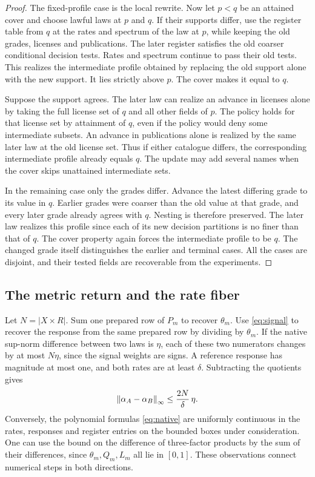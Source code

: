 \begin{proof}
The fixed-profile case is the local rewrite. Now let \(p<q\) be an
attained cover and choose lawful laws at \(p\) and \(q\).
If their supports differ, use the register table from \(q\) at the
rates and spectrum of the law at \(p\), while keeping the old grades,
licenses and publications. The later register satisfies the old coarser
conditional decision tests. Rates and spectrum continue to pass their
old tests. This realizes the intermediate profile obtained by replacing
the old support alone with the new support. It lies strictly above \(p\).
The cover makes it equal to \(q\).

Suppose the support agrees. The later law can realize an advance in
licenses alone by taking the full license set of \(q\) and all other
fields of \(p\). The policy holds for that license set by attainment of
\(q\), even if the policy would deny some intermediate subsets.
An advance in publications alone is realized by the same later law
at the old license set. Thus if either catalogue differs, the
corresponding intermediate profile already equals \(q\). The update
may add several names when the cover skips unattained intermediate
sets.

In the remaining case only the grades differ. Advance the latest
differing grade to its value in \(q\). Earlier grades were coarser than the
old value at that grade, and every later grade already agrees with \(q\).
Nesting is therefore preserved. The later law realizes this profile
since each of its new decision partitions is no finer than that of \(q\).
The cover property again forces the intermediate profile to be \(q\).
The changed grade itself distinguishes the earlier and terminal cases.
All the cases are disjoint, and their tested fields are recoverable
from the experiments.
\end{proof}

\subsection{The metric return and the rate fiber}

Let \(N=|X\times R|\). Sum one prepared row of \(P_m\) to recover
\(\theta_m\). Use \eqref{eq:signal} to recover the response from the same
prepared row by dividing by \(\theta_m\).
If the native sup-norm difference between two laws is \(\eta\),
each of these two numerators changes by at most \(N\eta\), since
the signal weights are signs. A reference response has magnitude at
most one, and both rates are at least \(\delta\). Subtracting the
quotients gives
\begin{equation}\label{eq:inverse-modulus}
 \left\lVert \alpha_A-\alpha_B \right\rVert_\infty\le \frac{2N}{\delta}\,\eta .
\end{equation}
Conversely, the polynomial formulas \eqref{eq:native} are uniformly
continuous in the rates, responses and register entries on the
bounded boxes under consideration. One can use the bound on the
difference of three-factor products by the sum of their differences,
since \(\theta_m,Q_m,L_m\) all lie in \([0,1]\).
These observations connect numerical steps in both directions.

